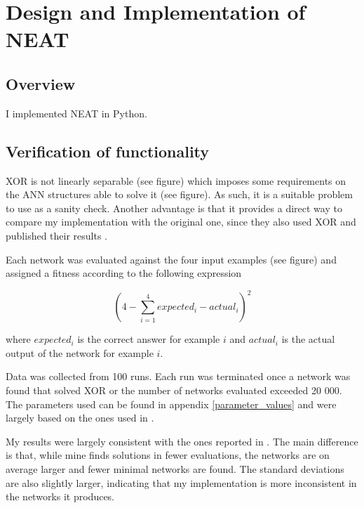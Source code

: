 
\newpage
\section{Design and Implementation of NEAT}
\subsection{Overview}
I implemented NEAT in Python.

\subsection{Verification of functionality}
XOR is not linearly separable (see figure) which imposes some requirements on the ANN structures able to solve it (see figure).
As such, it is a suitable problem to use as a sanity check. Another advantage is that it provides a direct way to compare my
implementation with the original one, since they also used XOR and published their results \cite{neat_main}.

Each network was evaluated against the four input examples (see figure) and assigned a fitness according to the following expression

\begin{equation*} \label{eq:1}
    (4 - \sum_{i=1}^{4} expected_{i} - actual_{i})^2
\end{equation*}

where $expected_{i}$ is the correct answer for example $i$ and $actual_{i}$ is the actual output of the network for example $i$.

Data was collected from 100 runs. Each run was terminated once a network was found that solved
XOR or the number of networks evaluated exceeded 20 000. The parameters used can be found in
appendix \ref{parameter_values} and were largely based on the ones used in \cite{neat_phd}.

My results were largely consistent with the ones reported in \cite{neat_main}. The main difference
is that, while mine finds solutions in fewer evaluations, the networks are on average larger and
fewer minimal networks are found. The standard deviations are also slightly larger, indicating that
my implementation is more inconsistent in the networks it produces.


